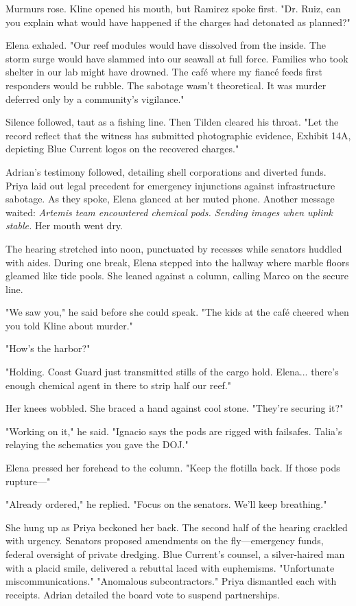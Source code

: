 Murmurs rose. Kline opened his mouth, but Ramirez spoke first. "Dr. Ruiz, can you explain what would have happened if the charges had detonated as planned?"

Elena exhaled. "Our reef modules would have dissolved from the inside. The storm surge would have slammed into our seawall at full force. Families who took shelter in our lab might have drowned. The café where my fiancé feeds first responders would be rubble. The sabotage wasn't theoretical. It was murder deferred only by a community's vigilance."

Silence followed, taut as a fishing line. Then Tilden cleared his throat. "Let the record reflect that the witness has submitted photographic evidence, Exhibit 14A, depicting Blue Current logos on the recovered charges."

Adrian's testimony followed, detailing shell corporations and diverted funds. Priya laid out legal precedent for emergency injunctions against infrastructure sabotage. As they spoke, Elena glanced at her muted phone. Another message waited: \textit{Artemis team encountered chemical pods. Sending images when uplink stable.} Her mouth went dry.

The hearing stretched into noon, punctuated by recesses while senators huddled with aides. During one break, Elena stepped into the hallway where marble floors gleamed like tide pools. She leaned against a column, calling Marco on the secure line.

"We saw you," he said before she could speak. "The kids at the café cheered when you told Kline about murder."

"How's the harbor?"

"Holding. Coast Guard just transmitted stills of the cargo hold. Elena... there's enough chemical agent in there to strip half our reef."

Her knees wobbled. She braced a hand against cool stone. "They're securing it?"

"Working on it," he said. "Ignacio says the pods are rigged with failsafes. Talia's relaying the schematics you gave the DOJ."

Elena pressed her forehead to the column. "Keep the flotilla back. If those pods rupture—"

"Already ordered," he replied. "Focus on the senators. We'll keep breathing."

She hung up as Priya beckoned her back. The second half of the hearing crackled with urgency. Senators proposed amendments on the fly—emergency funds, federal oversight of private dredging. Blue Current's counsel, a silver-haired man with a placid smile, delivered a rebuttal laced with euphemisms. "Unfortunate miscommunications." "Anomalous subcontractors." Priya dismantled each with receipts. Adrian detailed the board vote to suspend partnerships.

